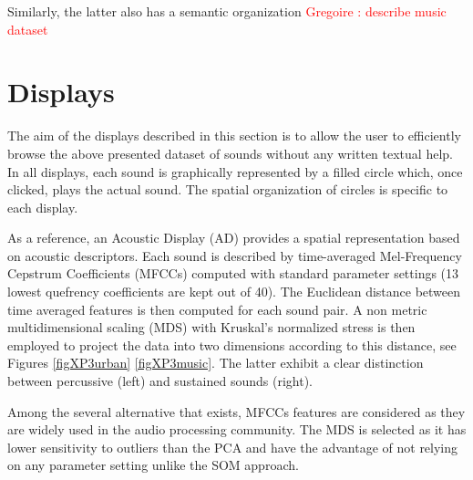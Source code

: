 \documentclass{aes2e}
\newcommand{\gl}[1]{\textcolor{red}{Gregoire : #1}}
\begin{document}
Similarly, the latter also has a semantic organization \gl{describe music dataset}


\section{Displays} \label{display}

The aim of the displays described in this section is to allow the user to efficiently browse the above presented dataset of sounds without any written textual help. In all displays, each sound is graphically represented by a filled circle which, once clicked, plays the actual sound. The spatial organization of circles is specific to each display.

As a reference, an Acoustic Display (AD) provides a spatial representation based on acoustic descriptors. Each sound is described by time-averaged Mel-Frequency Cepstrum Coefficients (MFCCs) computed with standard parameter settings (13 lowest quefrency coefficients are kept out of 40). The Euclidean distance between time averaged features is then computed for each sound pair. A non metric multidimensional scaling (MDS) with Kruskal's normalized stress \cite{kruskal1964multidimensional} is then employed to project the data into two dimensions according to this distance, see Figures \ref{figXP3urban} \ref{figXP3music}. The latter exhibit a clear distinction between percussive (left) and sustained sounds (right).

Among the several alternative that exists, MFCCs features are considered as they are widely used in the audio processing community. The MDS is selected as it has lower sensitivity to outliers than the PCA and have the advantage of not relying on any parameter setting unlike the SOM approach. 

\end{document}
